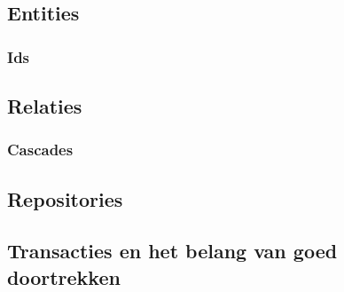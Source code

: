 \subsection{Entities}

\subsubsection*{Ids}

\subsection{Relaties}

\subsubsection*{Cascades}

\subsection{Repositories}

\subsection{Transacties en het belang van goed doortrekken}

